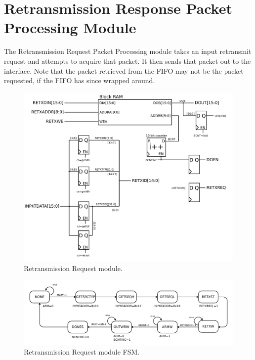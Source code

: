\section{Retransmission Response Packet Processing Module} 

The Retransmission Request Packet Processing module takes an input
retransmit request and attempts to acquire that packet. It then sends
that packet out to the interface. Note that the packet retrieved from
the FIFO may not be the packet requested, if the FIFO has since
wrapped around.

\begin{figure}
\begin{centering}
\includegraphics[scale=0.8]{retxresponse.svg}
\end{centering}
\caption{Retransmission Request module.}
\label{retxresponse}
\end{figure}

\begin{figure}
\begin{centering}
\includegraphics[scale=0.8]{retxresponse.fsm.svg}
\end{centering}
\caption{Retransmission Request module FSM.}
\label{retxresponse.fsm}
\end{figure}
